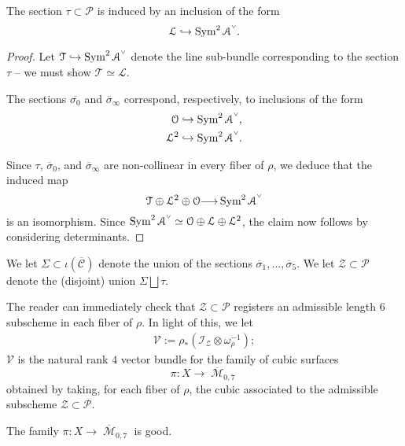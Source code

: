 \documentclass[12pt,reqno]{amsart}
\DeclareMathOperator{\M}{\mathcal{M}}
\renewcommand{\to}{{\longrightarrow}}
\numberwithin{equation}{section}
\renewcommand{\O}{\mathcal O}
\newcommand{\V}{\mathcal V}
\newcommand{\cP}{\mathcal P}
\newcommand{\smvee}{\raise0.5ex\hbox{$\scriptscriptstyle\vee$}}
\renewcommand {\o}[1]{\overline{#1}}
\begin{document}
\begin{lemma}
  \label{lemma:tau}
  The section $\tau \subset \cP$ is induced by an inclusion of the
  form
  $${\mathcal{L}} \hookrightarrow \Sym^{2} \mathcal{A}^{\smvee}.$$
\end{lemma}

\begin{proof}
  Let $\mathcal{T} \hookrightarrow \Sym^{2} \mathcal{A}^{\smvee}$
  denote the line sub-bundle corresponding to the section $\tau$ -- we
  must show $\mathcal{T} \simeq \mathcal{L}$.

  The sections
  $\o{\sigma_{0}}$ and $\o{\sigma}_{\infty}$ correspond, respectively,
  to inclusions of the form
  \begin{align*}
    \O \hookrightarrow \Sym^{2} \mathcal{A}^{\smvee}, \\
    \mathcal{L}^{2} \hookrightarrow \Sym^{2} \mathcal{A}^{\smvee}. \\
  \end{align*}

  Since $\tau$, $\o{\sigma}_{0}$, and $\o{\sigma}_{\infty}$ are
  non-collinear in every fiber of $\rho$, we deduce that the induced
  map
  $$\mathcal{T} \oplus \mathcal{L}^{2} \oplus \O \to \Sym^{2}
  \mathcal{A}^{\smvee}$$ is an isomorphism.  Since
  $\Sym^{2} \mathcal{A}^{\smvee} \simeq \O \oplus \mathcal{L} \oplus
  \mathcal{L}^{2}$, the claim now follows by considering determinants.
\end{proof}


\begin{definition}
  \label{def:ZB2} We let $\Sigma \subset \iota(\o{\mathcal{C}})$
  denote the union of the sections
  $\o{\sigma}_{1}, \dots, \o{\sigma}_{5}$.  We let
  $\mathcal{Z} \subset \cP$ denote the (disjoint) union
  $\Sigma \bigsqcup \tau$.
\end{definition}

The reader can immediately check that $\mathcal{Z} \subset \cP$
registers an admissible length $6$ subscheme in each fiber of
$\rho$. In light of this, we let
\begin{align}
  \label{eq:VB2}
  \mathcal{V} := \rho_{*}(\mathcal{I}_{\mathcal{Z}} \otimes \omega_{\rho}^{-1});
\end{align}
$\V$ is the natural rank $4$ vector bundle for the family of cubic
surfaces $$\pi: X \to \o{\M}_{0,7}$$ obtained by taking, for each
fiber of $\rho$, the cubic associated to the admissible subscheme
$\mathcal{Z} \subset \cP$.

\begin{proposition}
  \label{prop:goodnessB2} The family $\pi: X \to \o{\M}_{0,7}$ is
  good.
\end{proposition}
\end{document}
